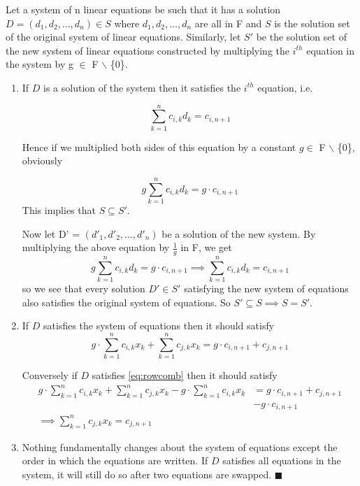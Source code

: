 \documentclass[oneside]{book}
\begin{document}
	\begin{pr}
		Let a system of n linear equations be such that it has a solution $D=(d_1,d_2,\ldots,d_n) \in S$ where $d_1,d_2,\ldots,d_n$ are all in F and $S$ is the solution set of the original system of linear equations. Similarly, let $S'$ be the solution set of the new system of linear equations constructed by multiplying the $i^{th}$ equation in the system by g $\in$ F $\backslash$ \{0\}.
	\begin{enumerate}
		\item If $D$ is a solution of the system then it satisfies the $i^{th}$ equation, i.e.
		
		\begin{equation*}
			\sum_{k=1}^{n}{c_{i,k}d_k}=c_{i,n+1}
		\end{equation*}
		
		Hence if we multiplied both sides of this equation by a constant $g \in$ F $\backslash$ \{0\}, obviously
		
		\begin{equation*}
			g\sum_{k=1}^{n}{c_{i,k}d_k}=g \cdot c_{i,n+1}
		\end{equation*}
		This implies that $S \subseteq S'$.
		
		Now let D' = $(d'_1,d'_2,\ldots,d'_n)$ be a solution of the new system.
		By multiplying the above equation by $\frac{1}{g}$ in F, we get 			
		\begin{equation*}
			g\sum_{k=1}^{n}{c_{i,k}d_k}=g \cdot c_{i,n+1}
			\implies 
			\sum_{k=1}^{n}{c_{i,k}d_k}=c_{i,n+1}
		\end{equation*}
		so we see that every solution $D' \in S'$ satisfying the new system of equations also satisfies the original system of equations. So $S' \subseteq S \implies S=S'$.
	\item If $D$ satisfies the system of equations then it should satisfy
	\begin{equation}
		\label{eq:rowcomb}
		g \cdot \sum_{k=1}^{n}{c_{i,k}x_k}+\sum_{k=1}^{n}{c_{j,k}x_k}=g\cdot c_{i,n+1}+c_{j,n+1}
	\end{equation}

	Conversely if $D$ satisfies \ref{eq:rowcomb} then it should satisfy	
	\begin{equation*}
		\begin{split}
			g \cdot \sum_{k=1}^{n}{c_{i,k}x_k}+\sum_{k=1}^{n}{c_{j,k}x_k}-g \cdot\sum_{k=1}^{n}{c_{i,k}x_k}&=g \cdot c_{i,n+1}+c_{j,n+1} \\
			&-g \cdot c_{i,n+1} \\
			\implies \sum_{k=1}^{n}{c_{j,k}x_k}=c_{j,n+1} &
		\end{split}
	\end{equation*}
	
	\item Nothing fundamentally changes about the system of equations except the order in which the equations are written. If $D$ satisfies all equations in the system, it will still do so after two equations are swapped. $\blacksquare$
	\end{enumerate}
	\end{pr}
\end{document}
